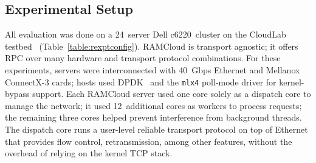 \begin{enumerate}
\end{enumerate}

\subsection{Experimental Setup}
\label{sec:setup}

All evaluation was done on a 24~server Dell c6220~cluster on the CloudLab
testbed~\cite{cloudlab} (Table~\ref{table:rexptconfig}).  RAMCloud is transport
agnostic; it offers RPC over many hardware and transport protocol
combinations.  For these experiments, servers were interconnected with 40~Gbps
Ethernet and Mellanox ConnectX-3 cards; hosts used DPDK~\cite{dpdk} and
the \texttt{mlx4} poll-mode driver for kernel-bypass support.  Each RAMCloud
server used one core solely as a dispatch core to manage the network; it used
12~additional cores as workers to process requests; the remaining
three cores helped prevent interference from background threads. The
dispatch core runs a user-level reliable transport protocol on top of
Ethernet that provides flow control, retransmission, among other
features, without the
overhead of relying on the kernel TCP stack.

